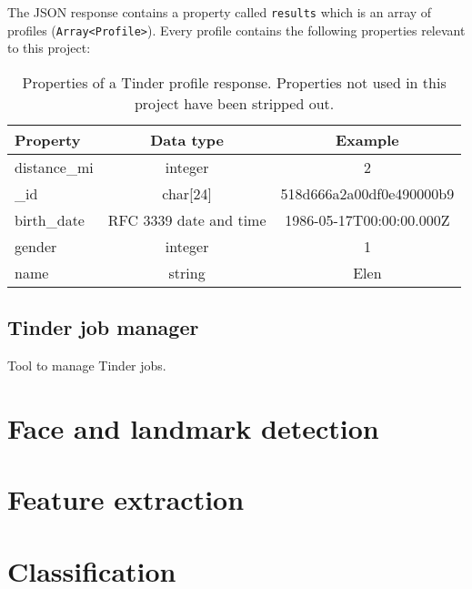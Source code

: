 The JSON response contains a property called \texttt{results} which is an 
array of profiles (\texttt{Array<Profile>}). Every profile contains the 
following properties relevant to this project:
\begin{table}
    \begin{center}
        \begin{tabular}{| l | c | c |}
            \hline
            Property       & Data type               & Example \\ \hline
            distance\_mi    & integer                 & 2 \\ \hline
            \_id            & char[24]                & 518d666a2a00df0e490000b9 \\ \hline
            birth\_date     & RFC 3339 date and time  & 1986-05-17T00:00:00.000Z \\ \hline
            gender         & integer                 & 1 \\ \hline
            name           & string                  & Elen \\ \hline
        \end{tabular}
    \end{center}
    \caption{Properties of a Tinder profile response. Properties not used in 
    this project have been stripped out.}
\end{table}


\subsection{Tinder job manager}
\label{spec:data:jobs}
Tool to manage Tinder jobs.

\section{Face and landmark detection}

\section{Feature extraction}

\section{Classification}

